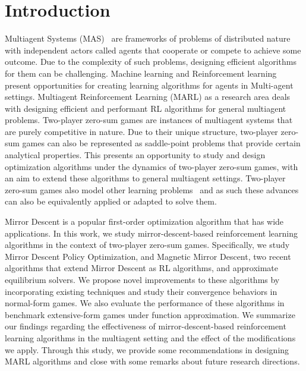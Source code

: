 \chapter{Introduction}

Multiagent Systems (MAS)~\cite{tuylsMultiagent2012} are frameworks of problems of distributed
nature with independent actors called agents that cooperate or compete to achieve some outcome.
Due to the complexity of such problems, designing efficient algorithms for them can be challenging.
Machine learning and Reinforcement learning present opportunities for creating learning algorithms
for agents in Multi-agent settings.
Multiagent Reinforcement Learning (MARL) as a research area deals with designing efficient and
performant RL algorithms for general multiagent problems.
Two-player zero-sum games are instances of multiagent systems that are purely competitive in
nature.
Due to their unique structure, two-player zero-sum games can also be represented as saddle-point
problems that provide certain analytical properties.
This presents an opportunity to study and design optimization algorithms under the dynamics of
two-player zero-sum games, with an aim to extend these algorithms to general multiagent settings.
Two-player zero-sum games also model other learning problems~\cite{goodfellowGenerative2014} and as
such these advances can also be equivalently applied or adapted to solve them.

Mirror Descent is a popular first-order optimization algorithm that has wide applications.
In this work, we study mirror-descent-based reinforcement learning algorithms in the context of
two-player zero-sum games.
Specifically, we study Mirror Descent Policy Optimization, and Magnetic Mirror Descent, two recent
algorithms that extend Mirror Descent as RL algorithms, and approximate equilibrium solvers.
We propose novel improvements to these algorithms by incorporating existing techniques and study
their convergence behaviors in normal-form games.
We also evaluate the performance of these algorithms in benchmark extensive-form games under
function approximation.
We summarize our findings regarding the effectiveness of mirror-descent-based reinforcement
learning algorithms in the multiagent setting and the effect of the modifications we apply.
Through this study, we provide some recommendations in designing MARL algorithms and close with some
remarks about future research directions.
